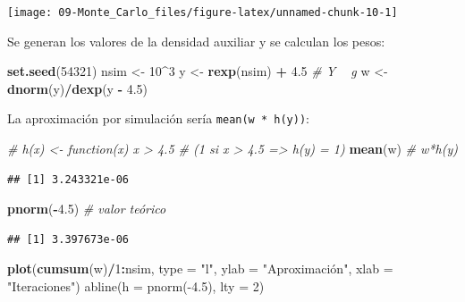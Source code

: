 \documentclass[]{book}
\newenvironment{Shaded}{\begin{snugshade}}{\end{snugshade}}
\newcommand{\KeywordTok}[1]{\textcolor[rgb]{0.13,0.29,0.53}{\textbf{#1}}}
\newcommand{\DataTypeTok}[1]{\textcolor[rgb]{0.13,0.29,0.53}{#1}}
\newcommand{\DecValTok}[1]{\textcolor[rgb]{0.00,0.00,0.81}{#1}}
\newcommand{\FloatTok}[1]{\textcolor[rgb]{0.00,0.00,0.81}{#1}}
\newcommand{\StringTok}[1]{\textcolor[rgb]{0.31,0.60,0.02}{#1}}
\newcommand{\CommentTok}[1]{\textcolor[rgb]{0.56,0.35,0.01}{\textit{#1}}}
\newcommand{\OperatorTok}[1]{\textcolor[rgb]{0.81,0.36,0.00}{\textbf{#1}}}
\newcommand{\NormalTok}[1]{#1}
\theoremstyle{definition}
\theoremstyle{definition}
\theoremstyle{definition}
\theoremstyle{remark}
\begin{document}
\begin{center}\texttt{[image: 09-Monte\_Carlo\_files/figure-latex/unnamed-chunk-10-1]} \end{center}

Se generan los valores de la densidad auxiliar y se calculan los pesos:

\begin{Shaded}
\begin{Highlighting}[]
\KeywordTok{set.seed}\NormalTok{(}\DecValTok{54321}\NormalTok{)}
\NormalTok{nsim <-}\StringTok{ }\DecValTok{10}\OperatorTok{^}\DecValTok{3}
\NormalTok{y <-}\StringTok{ }\KeywordTok{rexp}\NormalTok{(nsim) }\OperatorTok{+}\StringTok{ }\FloatTok{4.5}    \CommentTok{#  Y ~ g}
\NormalTok{w <-}\StringTok{ }\KeywordTok{dnorm}\NormalTok{(y)}\OperatorTok{/}\KeywordTok{dexp}\NormalTok{(y }\OperatorTok{-}\StringTok{ }\FloatTok{4.5}\NormalTok{)}
\end{Highlighting}
\end{Shaded}

La aproximación por simulación sería \texttt{mean(w\ *\ h(y))}:

\begin{Shaded}
\begin{Highlighting}[]
\CommentTok{# h(x) <- function(x) x > 4.5  # (1 si x > 4.5 => h(y) = 1)}
\KeywordTok{mean}\NormalTok{(w) }\CommentTok{# w*h(y)}
\end{Highlighting}
\end{Shaded}

\begin{verbatim}
## [1] 3.243321e-06
\end{verbatim}

\begin{Shaded}
\begin{Highlighting}[]
\KeywordTok{pnorm}\NormalTok{(}\OperatorTok{-}\FloatTok{4.5}\NormalTok{)  }\CommentTok{# valor teórico}
\end{Highlighting}
\end{Shaded}

\begin{verbatim}
## [1] 3.397673e-06
\end{verbatim}

\begin{Shaded}
\begin{Highlighting}[]
\KeywordTok{plot}\NormalTok{(}\KeywordTok{cumsum}\NormalTok{(w)}\OperatorTok{/}\DecValTok{1}\OperatorTok{:}\NormalTok{nsim, }\DataTypeTok{type =} \StringTok{"l"}\NormalTok{, }\DataTypeTok{ylab =} \StringTok{"Aproximación", xlab = "}\NormalTok{Iteraciones}\StringTok{")}
\StringTok{abline(h = pnorm(-4.5), lty = 2)}
\end{Highlighting}
\end{Shaded}
\end{document}
